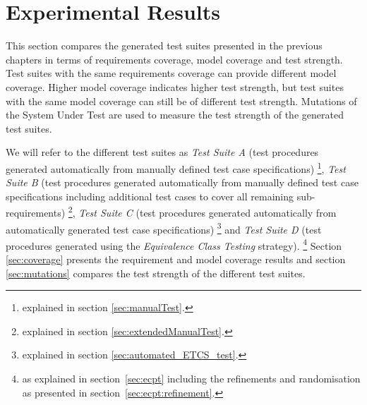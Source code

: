 \section{Experimental Results}\label{chap:results}

This section compares the generated test suites presented in the previous
chapters in terms of requirements coverage, model coverage and test strength.
Test suites with the same requirements coverage can provide different model coverage.
Higher model coverage indicates higher test strength, but test suites with
the same model coverage can still be of different test strength. Mutations
of the System Under Test are used to measure the test strength of the
generated test suites.

We will refer to the different test suites as
\emph{Test Suite A} (test procedures generated automatically from manually
defined test case specifications)
\footnote{explained in section \ref{sec:manualTest}.},
\emph{Test Suite B} (test procedures generated automatically from manually
defined test case specifications including additional test cases to cover all remaining sub-requirements)
\footnote{explained in section \ref{sec:extendedManualTest}.},
\emph{Test Suite C} (test procedures generated automatically from
automatically generated test case specifications)
\footnote{explained in section \ref{sec:automated_ETCS_test}.}
and \emph{Test Suite D}
(test procedures generated using the \emph{Equivalence Class Testing}
strategy).
\footnote{as explained in section~\ref{sec:ecpt} including the refinements and randomisation as presented in section~\ref{sec:ecpt:refinement}.}
Section \ref{sec:coverage} presents the requirement
and model coverage results and section \ref{sec:mutations} compares the
test strength of the different test suites.




